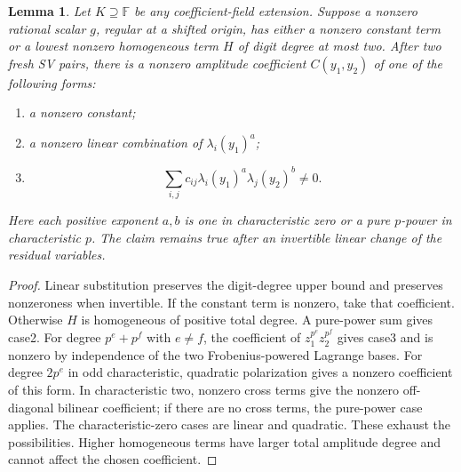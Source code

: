 \documentclass[11pt]{article}
\newtheorem{lemma}[theorem]{Lemma}
\newcommand{\F}{\mathbb F}
\begin{document}
\begin{lemma}\label{lem:witness}
Let \(K\supseteq\F\) be any coefficient-field extension.
Suppose a nonzero rational scalar \(g\), regular at a shifted origin,
has either a nonzero constant term or a lowest nonzero homogeneous
term \(H\) of digit degree at most two.
After two fresh SV pairs, there is a nonzero amplitude coefficient
\(C(y_1,y_2)\) of one of the following forms:
\begin{enumerate}
\item a nonzero constant;
\item a nonzero linear combination of \(\lambda_i(y_1)^a\);
\item
\[
 \sum_{i,j}c_{ij}\lambda_i(y_1)^a\lambda_j(y_2)^b\ne0.
\]
\end{enumerate}
Here each positive exponent \(a,b\) is one in characteristic zero
or a pure \(p\)-power in characteristic \(p\).
The claim remains true after an invertible linear change of the
residual variables.
\end{lemma}
\begin{proof}
Linear substitution preserves the digit-degree upper bound and
preserves nonzeroness when invertible.
If the constant term is nonzero, take that coefficient.
Otherwise \(H\) is homogeneous of positive total degree.
A pure-power sum gives case2.
For degree \(p^e+p^f\) with \(e\ne f\), the coefficient of
\(z_1^{p^e}z_2^{p^f}\) gives case3 and is nonzero by independence
of the two Frobenius-powered Lagrange bases.
For degree \(2p^e\) in odd characteristic, quadratic polarization
gives a nonzero coefficient of this form.
In characteristic two, nonzero cross terms give the nonzero
off-diagonal bilinear coefficient; if there are no cross terms,
the pure-power case applies.
The characteristic-zero cases are linear and quadratic.
These exhaust the possibilities. Higher homogeneous terms have
larger total amplitude degree and cannot affect the chosen coefficient.
\end{proof}
\end{document}
